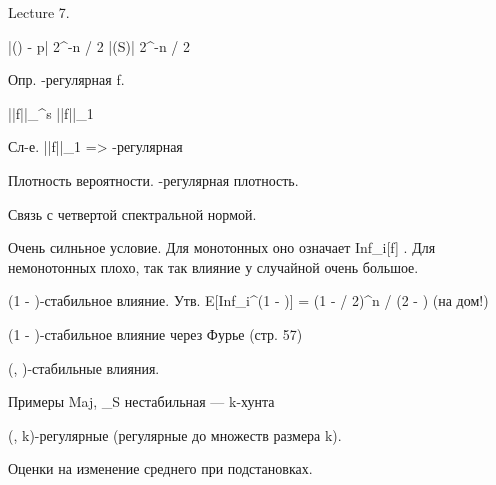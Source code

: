 Lecture 7.

|(\emptyset) - p|   2^{-n / 2}
|(S)|   2^{-n / 2}


Опр. \epsilon-регулярная f.

||f||_{\infty}^{s} \le ||f||_1

Сл-е. ||f||_1 \le \epsilon => \epsilon-регулярная


Плотность вероятности. \epsilon-регулярная плотность.

Связь с четвертой спектральной нормой.


Очень силньное условие. Для монотонных оно означает Inf_i[f] \le \epsilon.
Для немонотонных плохо, так так влияние у случайной очень большое.

(1 - \delta)-стабильное влияние.
Утв. E[Inf_i^{(1 - \delta)}] = (1 - \delta / 2)^n / (2 - \delta) (на дом!)

(1 - \delta)-стабильное влияние через Фурье (стр. 57)


(\epsilon, \delta)-стабильные влияния.

Примеры Maj, \chi_S
нестабильная --- k-хунта


(\epsilon, k)-регулярные (регулярные до множеств размера k).

Оценки на изменение среднего при подстановках.